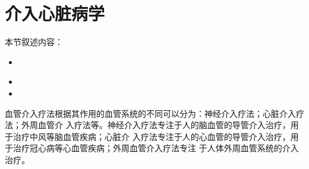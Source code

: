 \section{介入心脏病学}
\label{sec2-1}

本节叙述内容：
\begin{itemize}
  \item　
  \item
  \item
\end{itemize}

血管介入疗法根据其作用的血管系统的不同可以分为：神经介入疗法；心脏介入疗法；外周血管介
入疗法等。神经介入疗法专注于人的脑血管的导管介入治疗，用于治疗中风等脑血管疾病；心脏介
入疗法专注于人的心血管的导管介入治疗，用于治疗冠心病等心血管疾病；外周血管介入疗法专注
于人体外周血管系统的介入治疗\cite{coles2011surveyCRaIVE}。